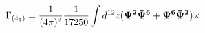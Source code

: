 \begin{equation}\label{g4-1}
\Gamma_{(4_{1})}={1\over (4\pi)^{2}}{1\over
17250}\int d^{12}z ({\bf
\Psi^{2}\bar{\Psi}^{6}+\Psi^{6}\bar{\Psi}^{2}})\times
\end{equation}

